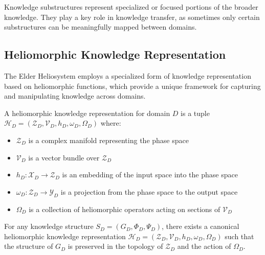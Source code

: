 Knowledge substructures represent specialized or focused portions of the broader knowledge. They play a key role in knowledge transfer, as sometimes only certain substructures can be meaningfully mapped between domains.

\subsection{Heliomorphic Knowledge Representation}

The Elder Heliosystem employs a specialized form of knowledge representation based on heliomorphic functions, which provide a unique framework for capturing and manipulating knowledge across domains.

\begin{definition}
A heliomorphic knowledge representation for domain $D$ is a tuple $\mathcal{H}_D = (\mathcal{Z}_D, \mathcal{V}_D, h_D, \omega_D, \Omega_D)$ where:
\begin{itemize}
    \item $\mathcal{Z}_D$ is a complex manifold representing the phase space
    \item $\mathcal{V}_D$ is a vector bundle over $\mathcal{Z}_D$
    \item $h_D: \mathcal{X}_D \to \mathcal{Z}_D$ is an embedding of the input space into the phase space
    \item $\omega_D: \mathcal{Z}_D \to \mathcal{Y}_D$ is a projection from the phase space to the output space
    \item $\Omega_D$ is a collection of heliomorphic operators acting on sections of $\mathcal{V}_D$
\end{itemize}
\end{definition}

\begin{theorem}
For any knowledge structure $S_D = (G_D, \Phi_D, \Psi_D)$, there exists a canonical heliomorphic knowledge representation $\mathcal{H}_D = (\mathcal{Z}_D, \mathcal{V}_D, h_D, \omega_D, \Omega_D)$ such that the structure of $G_D$ is preserved in the topology of $\mathcal{Z}_D$ and the action of $\Omega_D$.
\end{theorem}

